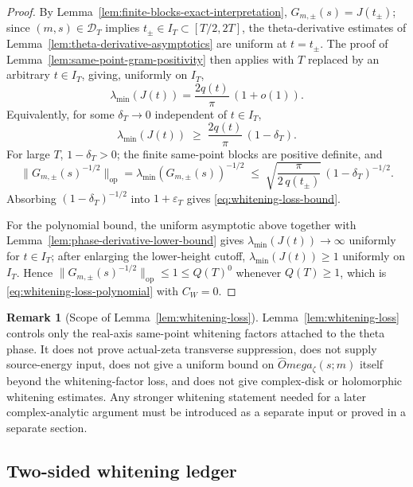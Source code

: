 \documentclass[11pt,a4paper]{amsart}
\def\Omega{Omega}%
\numberwithin{equation}{section}
\theoremstyle{plain}
\theoremstyle{definition}
\newtheorem{remark}[theorem]{Remark}
\newcommand{\z}{\zeta}
\newcommand{\Om}{\Omega}
\newcommand{\op}{\mathrm{op}}
\begin{document}
\begin{proof}
By Lemma~\ref{lem:finite-blocks-exact-interpretation},
\(G_{m,\pm}(s) = J(t_\pm)\); since \((m,s)\in\mathcal D_T\) implies
\(t_\pm\in I_T\subset[T/2, 2T]\), the theta-derivative estimates of
Lemma~\ref{lem:theta-derivative-asymptotics} are uniform at
\(t = t_\pm\).  The proof of Lemma~\ref{lem:same-point-gram-positivity}
then applies with \(T\) replaced by an arbitrary \(t\in I_T\), giving,
uniformly on \(I_T\),
\[
        \lambda_{\min}(J(t))
        = \frac{2q(t)}{\pi}\,(1 + o(1)).
\]
Equivalently, for some \(\delta_T\to 0\) independent of \(t\in I_T\),
\[
        \lambda_{\min}(J(t))
        \;\ge\; \frac{2q(t)}{\pi}\,(1-\delta_T).
\]
For large \(T\), \(1-\delta_T > 0\); the finite same-point blocks are
positive definite, and
\[
        \bigl\|G_{m,\pm}(s)^{-1/2}\bigr\|_{\op}
        = \lambda_{\min}(G_{m,\pm}(s))^{-1/2}
        \;\le\; \sqrt{\frac{\pi}{2\,q(t_\pm)}}\,(1-\delta_T)^{-1/2}.
\]
Absorbing \((1-\delta_T)^{-1/2}\) into \(1+\varepsilon_T\) gives
\eqref{eq:whitening-loss-bound}.

For the polynomial bound, the uniform asymptotic above together with
Lemma~\ref{lem:phase-derivative-lower-bound} gives
\(\lambda_{\min}(J(t))\to\infty\) uniformly for \(t\in I_T\); after
enlarging the lower-height cutoff,
\(\lambda_{\min}(J(t))\ge 1\) uniformly on \(I_T\).  Hence
\(\|G_{m,\pm}(s)^{-1/2}\|_{\op}\le 1\le Q(T)^0\) whenever
\(Q(T)\ge 1\), which is \eqref{eq:whitening-loss-polynomial} with
\(C_W = 0\).
\end{proof}

\begin{remark}[Scope of Lemma~\ref{lem:whitening-loss}]
\label{rem:whitening-loss-scope}
Lemma~\ref{lem:whitening-loss} controls only the real-axis same-point
whitening factors attached to the theta phase.  It does not prove
actual-zeta transverse suppression, does not supply source-energy
input, does not give a uniform bound on \(\widehat\Om_\z(s;m)\) itself
beyond the whitening-factor loss, and does not give complex-disk or
holomorphic whitening estimates.  Any stronger whitening statement
needed for a later complex-analytic argument must be introduced as a
separate input or proved in a separate section.
\end{remark}

\subsection{Two-sided whitening ledger}
\label{subsec:two-sided-whitening-ledger}
\end{document}

